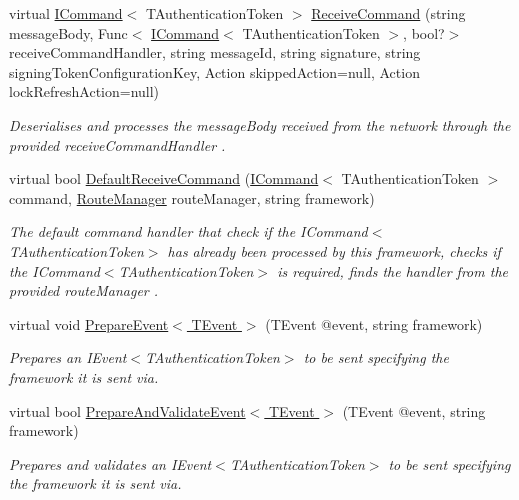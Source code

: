 \begin{DoxyCompactItemize}
virtual \hyperlink{interfaceCqrs_1_1Commands_1_1ICommand}{I\+Command}$<$ T\+Authentication\+Token $>$ \hyperlink{classCqrs_1_1Azure_1_1ServiceBus_1_1AzureBusHelper_a89f4ae84aad951fa8f4809f3b23a1893_a89f4ae84aad951fa8f4809f3b23a1893}{Receive\+Command} (string message\+Body, Func$<$ \hyperlink{interfaceCqrs_1_1Commands_1_1ICommand}{I\+Command}$<$ T\+Authentication\+Token $>$, bool?$>$ receive\+Command\+Handler, string message\+Id, string signature, string signing\+Token\+Configuration\+Key, Action skipped\+Action=null, Action lock\+Refresh\+Action=null)
\begin{DoxyCompactList}\small\item\em Deserialises and processes the {\itshape message\+Body}  received from the network through the provided {\itshape receive\+Command\+Handler} . \end{DoxyCompactList}\item 
virtual bool \hyperlink{classCqrs_1_1Azure_1_1ServiceBus_1_1AzureBusHelper_ae35c260f46f8aa7ba928815187b9088e_ae35c260f46f8aa7ba928815187b9088e}{Default\+Receive\+Command} (\hyperlink{interfaceCqrs_1_1Commands_1_1ICommand}{I\+Command}$<$ T\+Authentication\+Token $>$ command, \hyperlink{classCqrs_1_1Bus_1_1RouteManager}{Route\+Manager} route\+Manager, string framework)
\begin{DoxyCompactList}\small\item\em The default command handler that check if the I\+Command$<$\+T\+Authentication\+Token$>$ has already been processed by this framework, checks if the I\+Command$<$\+T\+Authentication\+Token$>$ is required, finds the handler from the provided {\itshape route\+Manager} . \end{DoxyCompactList}\item 
virtual void \hyperlink{classCqrs_1_1Azure_1_1ServiceBus_1_1AzureBusHelper_afb3ade39a8f8fd39c871c687701d80f4_afb3ade39a8f8fd39c871c687701d80f4}{Prepare\+Event$<$ T\+Event $>$} (T\+Event @event, string framework)
\begin{DoxyCompactList}\small\item\em Prepares an I\+Event$<$\+T\+Authentication\+Token$>$ to be sent specifying the framework it is sent via. \end{DoxyCompactList}\item 
virtual bool \hyperlink{classCqrs_1_1Azure_1_1ServiceBus_1_1AzureBusHelper_ab0f6ff2ee04ad3b58e6713caebd3b560_ab0f6ff2ee04ad3b58e6713caebd3b560}{Prepare\+And\+Validate\+Event$<$ T\+Event $>$} (T\+Event @event, string framework)
\begin{DoxyCompactList}\small\item\em Prepares and validates an I\+Event$<$\+T\+Authentication\+Token$>$ to be sent specifying the framework it is sent via. \end{DoxyCompactList}\item 

\end{DoxyCompactItemize}
